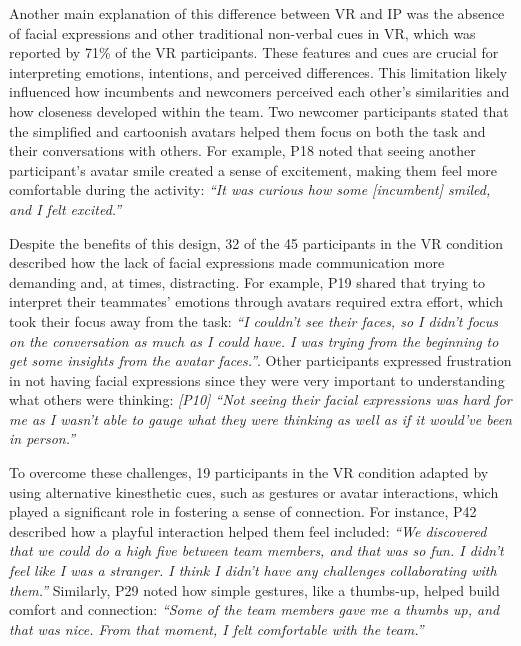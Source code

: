 Another main explanation of this difference between VR and IP was the absence of facial expressions and other traditional non-verbal cues in VR, which was reported by 71\% of the VR participants. These features and cues are crucial for interpreting emotions, intentions, and perceived differences. This limitation likely influenced how incumbents and newcomers perceived each other's similarities and how closeness developed within the team. Two newcomer participants stated that the simplified and cartoonish avatars helped them focus on both the task and their conversations with others. For example, P18 noted that seeing another participant's avatar smile created a sense of excitement, making them feel more comfortable during the activity: \textit{``It was curious how some [incumbent] smiled, and I felt excited.''}

Despite the benefits of this design, 32 of the 45 participants in the VR condition described how the lack of facial expressions made communication more demanding and, at times, distracting. For example, P19 shared that trying to interpret their teammates' emotions through avatars required extra effort, which took their focus away from the task: \textit{``I couldn't see their faces, so I didn't focus on the conversation as much as I could have. I was trying from the beginning to get some insights from the avatar faces.''}. Other participants expressed frustration in not having facial expressions since they were very important to understanding what others were thinking: \textit{[P10] ``Not seeing their facial expressions was hard for me as I wasn't able to gauge what they were thinking as well as if it would've been in person.''}

To overcome these challenges, 19 participants in the VR condition adapted by using alternative kinesthetic cues, such as gestures or avatar interactions, which played a significant role in fostering a sense of connection. For instance, P42 described how a playful interaction helped them feel included: \textit{``We discovered that we could do a high five between team members, and that was so fun. I didn't feel like I was a stranger. I think I didn't have any challenges collaborating with them.''} Similarly, P29 noted how simple gestures, like a thumbs-up, helped build comfort and connection: \textit{``Some of the team members gave me a thumbs up, and that was nice. From that moment, I felt comfortable with the team.''}

